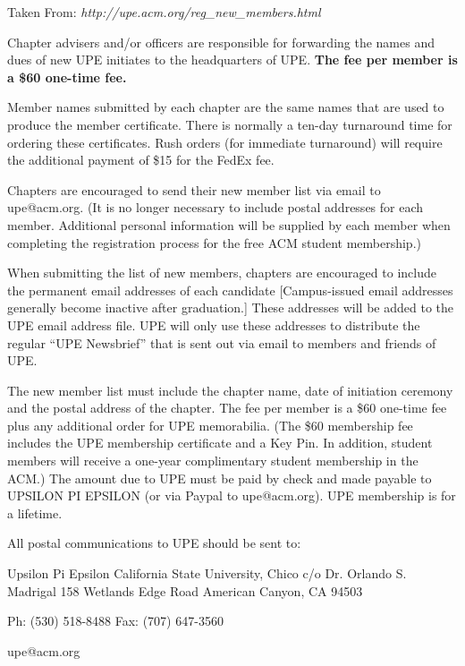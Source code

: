 \documentclass{letter}
\begin{document}
Taken From: \textit{http://upe.acm.org/reg_new_members.html}

Chapter advisers and/or officers are responsible for forwarding the names and dues of new UPE initiates to the headquarters of UPE.
\textbf{The fee per member is a \$60 one-time fee.}

Member names submitted by each chapter are the same names that are used to produce the member certificate. There is normally a ten-day turnaround time for ordering these certificates. Rush orders (for immediate turnaround) will require the additional payment of \$15 for the FedEx fee.

Chapters are encouraged to send their new member list via email to upe@acm.org. (It is no longer necessary to include postal addresses for each member. Additional personal information will be supplied by each member when completing the registration process for the free ACM student membership.)

When submitting the list of new members, chapters are encouraged to include the permanent email addresses of each candidate [Campus-issued email addresses generally become inactive after graduation.] These addresses will be added to the UPE email address file. UPE will only use these addresses to distribute the regular ``UPE Newsbrief'' that is sent out via email to members and friends of UPE.

The new member list must include the chapter name, date of initiation ceremony and the postal address of the chapter. The fee per member is a \$60 one-time fee plus any additional order for UPE memorabilia. (The \$60 membership fee includes the UPE membership certificate and a Key Pin. In addition, student members will receive a one-year complimentary student membership in the ACM.) The amount due to UPE must be paid by check and made payable to UPSILON PI EPSILON (or via Paypal to upe@acm.org). UPE membership is for a lifetime.

All postal communications to UPE should be sent to:

Upsilon Pi Epsilon
California State University, Chico
c/o Dr. Orlando S. Madrigal
158 Wetlands Edge Road
American Canyon, CA 94503

Ph: (530) 518-8488
Fax: (707) 647-3560

upe@acm.org
\end{document}
